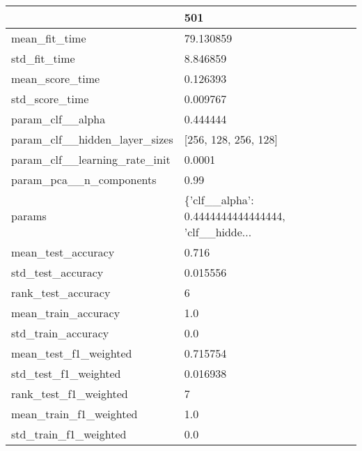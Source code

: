 \begin{tabular}{ll}
\toprule
{} &                                                501 \\
\midrule
mean\_fit\_time                 &                                          79.130859 \\
std\_fit\_time                  &                                           8.846859 \\
mean\_score\_time               &                                           0.126393 \\
std\_score\_time                &                                           0.009767 \\
param\_clf\_\_alpha              &                                           0.444444 \\
param\_clf\_\_hidden\_layer\_sizes &                               [256, 128, 256, 128] \\
param\_clf\_\_learning\_rate\_init &                                             0.0001 \\
param\_pca\_\_n\_components       &                                               0.99 \\
params                        &  \{'clf\_\_alpha': 0.4444444444444444, 'clf\_\_hidde... \\
mean\_test\_accuracy            &                                              0.716 \\
std\_test\_accuracy             &                                           0.015556 \\
rank\_test\_accuracy            &                                                  6 \\
mean\_train\_accuracy           &                                                1.0 \\
std\_train\_accuracy            &                                                0.0 \\
mean\_test\_f1\_weighted         &                                           0.715754 \\
std\_test\_f1\_weighted          &                                           0.016938 \\
rank\_test\_f1\_weighted         &                                                  7 \\
mean\_train\_f1\_weighted        &                                                1.0 \\
std\_train\_f1\_weighted         &                                                0.0 \\

\end{tabular}
